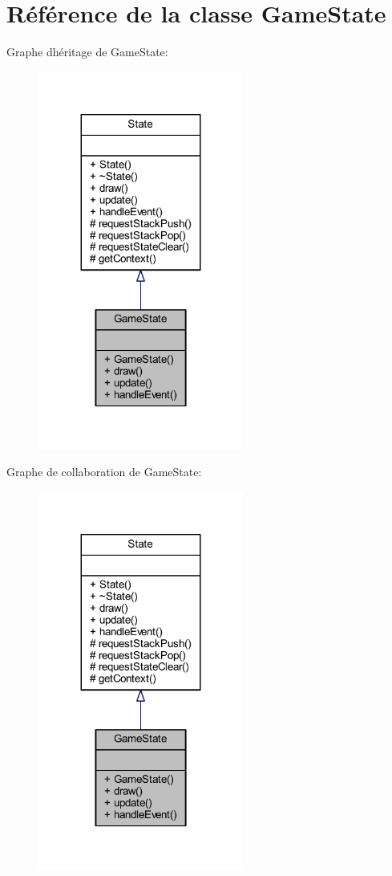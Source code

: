 \hypertarget{class_game_state}{}\section{Référence de la classe Game\+State}
\label{class_game_state}


Graphe d\textquotesingle{}héritage de Game\+State\+:\nopagebreak
\begin{figure}[H]
\begin{center}
\leavevmode
\includegraphics[width=191pt]{class_game_state__inherit__graph}
\end{center}
\end{figure}


Graphe de collaboration de Game\+State\+:\nopagebreak
\begin{figure}[H]
\begin{center}
\leavevmode
\includegraphics[width=191pt]{class_game_state__coll__graph}
\end{center}
\end{figure}

